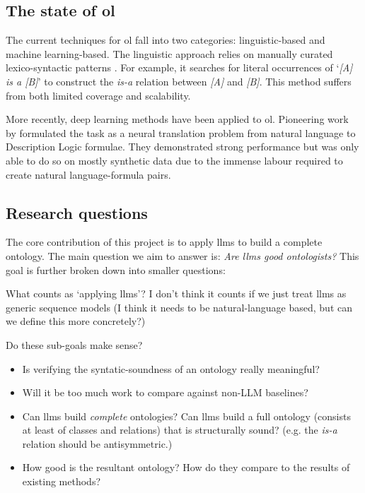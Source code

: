 \subsection*{The state of \gls{ol}}

The current techniques for \gls{ol} fall into two categories: linguistic-based and machine learning-based. The linguistic approach relies on manually curated lexico-syntactic patterns \citep{hearst,kietz}. For example, it searches for literal occurrences of `\emph{[A] is a [B]}' to construct the \emph{is-a} relation between \emph{[A]} and \emph{[B]}. This method suffers from both limited coverage and scalability.

More recently, deep learning methods have been applied to \gls{ol}. Pioneering work by \citet{rnn-dl,ol-as-translation} formulated the task as a neural translation problem from natural language to Description Logic formulae. They demonstrated strong performance but was only able to do so on mostly synthetic data due to the immense labour required to create natural language-formula pairs.

\subsection*{Research questions}

The core contribution of this project is to apply \gls{llm}s to build a complete ontology. The main question we aim to answer is: \emph{Are \gls{llm}s good ontologists?} This goal is further broken down into smaller questions:

\begin{note}
    What counts as `applying \gls{llm}s'? I don't think it counts if we just treat \gls{llm}s as generic sequence models (I think it needs to be natural-language based, but can we define this more concretely?)

    Do these sub-goals make sense?
    \begin{itemize}
        \item Is verifying the syntatic-soundness of an ontology really meaningful?
        \item Will it be too much work to compare against non-LLM baselines?
    \end{itemize}
\end{note}

\begin{itemize}
    \item Can \gls{llm}s build \emph{complete} ontologies? Can \gls{llm}s build a full ontology (consists at least of classes and relations) that is structurally sound? (e.g. the \emph{is-a} relation should be antisymmetric.)
    \item How good is the resultant ontology? How do they compare to the results of existing methods?
\end{itemize}

